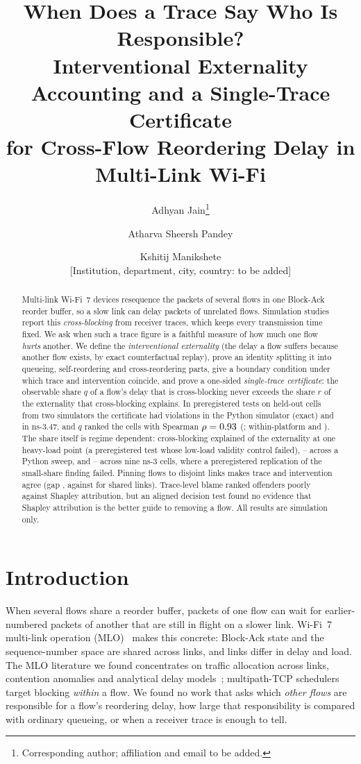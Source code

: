 \documentclass[11pt]{article}
\title{When Does a Trace Say Who Is Responsible?\\Interventional Externality Accounting and a Single-Trace Certificate\\for Cross-Flow Reordering Delay in Multi-Link Wi-Fi}
\author{Adhyan Jain\thanks{Corresponding author; affiliation and email to be added.} \and Atharva Sheersh Pandey \and Kshitij Manikshete\\[2pt]\small [Institution, department, city, country: to be added]}
\date{}
\begin{document}
\maketitle

\begin{abstract}
Multi-link Wi-Fi~7 devices resequence the packets of several flows in one Block-Ack reorder buffer, so a slow link can delay packets of unrelated flows.
Simulation studies report this \emph{cross-blocking} from receiver traces, which keeps every transmission time fixed.
We ask when such a trace figure is a faithful measure of how much one flow \emph{hurts} another.
We define the \emph{interventional externality} (the delay a flow suffers because another flow exists, by exact counterfactual replay), prove an identity splitting it into queueing, self-reordering and cross-reordering parts, give a boundary condition under which trace and intervention coincide, and prove a one-sided \emph{single-trace certificate}: the observable share $q$ of a flow's delay that is cross-blocking never exceeds the share $r$ of the externality that cross-blocking explains.
In preregistered tests on \FourDefined{} held-out cells from two simulators the certificate had \FourPyViol{} violations in the Python simulator (exact) and \FourNsViol{} in ns-3.47, and $q$ ranked the cells with Spearman $\rho=0.93$ (\FourRhoCI{}; within-platform \FourRhoPy{} and \FourRhoNs{}).
The share itself is regime dependent: cross-blocking explained \SBrFour{} of the externality at one heavy-load point (a preregistered test whose low-load validity control failed), \SBBCrossMin{}--\SBBCrossMax{} across a Python sweep, and \ElevenMin{}--\ElevenMax{} across nine ns-3 cells, where a preregistered replication of the small-share finding failed.
Pinning flows to disjoint links makes trace and intervention agree (gap \TenGapPinned{}, against \TenGapShared{} for shared links).
Trace-level blame ranked offenders poorly against Shapley attribution, but an aligned decision test found no evidence that Shapley attribution is the better guide to removing a flow.
All results are simulation only.
\end{abstract}

\section{Introduction}
When several flows share a reorder buffer, packets of one flow can wait for earlier-numbered packets of another that are still in flight on a slower link.
Wi-Fi~7 multi-link operation (MLO)~\cite{ieee80211be2024} makes this concrete: Block-Ack state and the sequence-number space are shared across links, and links differ in delay and load.
The MLO literature we found concentrates on traffic allocation across links, contention anomalies and analytical delay models~\cite{lopezraventos2022mlo,carrascosa2023understanding}; multipath-TCP schedulers target blocking \emph{within} a flow.
We found no work that asks which \emph{other flows} are responsible for a flow's reordering delay, how large that responsibility is compared with ordinary queueing, or when a receiver trace is enough to tell.
\end{document}
